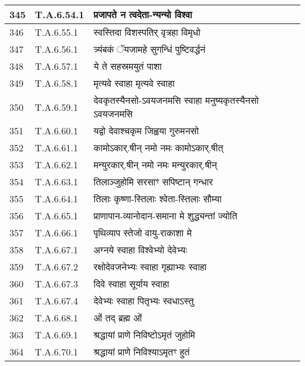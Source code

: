 \documentclass[17pt]{extarticle}
\begin{document}
\begin{longtable}{||p{0.4in}||p{0.9in}||p{4.0in}||p{0.9in}||}
        \hline
            345 & T.A.6.54.1 & प्रजापते न त्वदेता{-}न्यन्यो विश्वा &      \\
        \hline
            346 & T.A.6.55.1 & स्वस्तिदा विशस्पतिर् वृत्रहा विमृधो &      \\
        \hline
            347 & T.A.6.56.1 & त्र्यंबकं ॅयजामहे सुगन्धिं पुष्टिवर्द्धनं &      \\
        \hline
            348 & T.A.6.57.1 & ये ते सहस्रमयुतं पाशा &      \\
        \hline
            349 & T.A.6.58.1 & मृत्यवे स्वाहा मृत्यवे स्वाहा &      \\
        \hline
            350 & T.A.6.59.1 & देवकृतस्यैनसो{-}ऽवयजनमसि स्वाहा मनुष्यकृतस्यैनसो ऽवयजनमसि &      \\
        \hline
            351 & T.A.6.60.1 & यद्वो देवाश्चकृम जिह्वया गुरुमनसो &      \\
        \hline
            352 & T.A.6.61.1 & कामोऽकार्.षीन् नमो नमः कामोऽकार्.षीत् &      \\
        \hline
            353 & T.A.6.62.1 & मन्युरकार्.षीन् नमो नमः मन्युरकार्.षीन् &      \\
        \hline
            354 & T.A.6.63.1 & तिलाञ्जुहोमि सरसाꣳ सपिष्टान् गन्धार &      \\
        \hline
            355 & T.A.6.64.1 & तिलाः कृष्णा{-}स्तिलाः श्वेता{-}स्तिलाः सौम्या &      \\
        \hline
            356 & T.A.6.65.1 & प्राणापान{-}व्यानोदान{-}समाना मे शुद्ध्यन्तां ज्योति &      \\
        \hline
            357 & T.A.6.66.1 & पृथिव्याप स्तेजो वायु{-}राकाशा मे &      \\
        \hline
            358 & T.A.6.67.1 & अग्नये स्वाहा विश्वेभ्यो देवेभ्यः &      \\
        \hline
            359 & T.A.6.67.2 & रक्षोदेवजनेभ्यः स्वाहा गृह्याभ्यः स्वाहा &      \\
        \hline
            360 & T.A.6.67.3 & दिवे स्वाहा सूर्याय स्वाहा &      \\
        \hline
            361 & T.A.6.67.4 & देवेभ्यः स्वाहा पितृभ्यः स्वधाऽस्तु &      \\
        \hline
            362 & T.A.6.68.1 & ओं तद् ब्रह्म ओं &      \\
        \hline
            363 & T.A.6.69.1 & श्रद्धायां प्राणे निविष्टोऽमृतं जुहोमि &      \\
        \hline
            364 & T.A.6.70.1 & श्रद्धायां प्राणे निविश्याऽमृतꣳ हुतं &      \\

\end{longtable}
\end{document}
